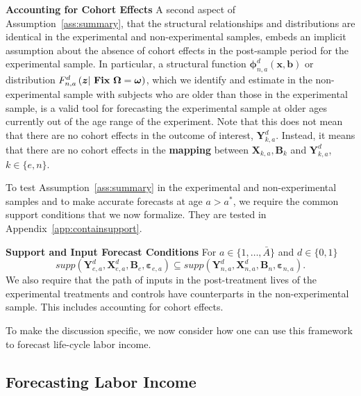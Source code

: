 \begin{remark} \label{remark:cohort} \textbf{Accounting for Cohort Effects}
A second aspect of Assumption~\ref{ass:summary}, that the structural relationships and distributions are identical in the experimental and non-experimental samples, embeds an implicit assumption about the absence of cohort effects in the post-sample period for the experimental sample. In particular, a structural function $\bm{\phi}_{n,a}^d \left( \bm{x}, \bm{b} \right)$ or distribution $F^d_{n,a} \left(\bm{z} | \text{ \text{\textbf{Fix}} } \bm{\Omega} = \bm{\omega}\right)$, which we identify and estimate in the non-experimental sample with subjects who are older than those in the experimental sample, is a valid tool for forecasting the experimental sample at older ages currently out of the age range of the experiment. Note that this does not mean that there are no cohort effects in the outcome of interest, $\bm{Y}^d_{k,a}$. Instead, it means that there are no cohort effects in the \textbf{mapping} between $\bm{X}_{k,a}, \bm{B}_k$ and $\bm{Y}_{k,a}^d$, $k \in \{e,n\}$.
\end{remark}

\doublespacing
To test Assumption~\ref{ass:summary} in the experimental and non-experimental samples and to make accurate forecasts at age $a > a^*$, we require the common support conditions that we now formalize. They are tested in Appendix~\ref{app:containsupport}.

\onehalfspacing
\begin{assumption} \label{ass:contain} \textbf{Support and Input Forecast Conditions}
For $a \in \{ 1, \ldots, \bar{A} \}$ and $d \in \{0,1\}$
\begin{equation}
supp( \bm{Y}_{e,a}^d, \bm{X}^d_{e,a}, \bm{B}_e, \bm{\varepsilon}_{e,a} ) \subseteq supp( \bm{Y}_{n,a}^d, \bm{X}^d_{n,a}, \bm{B}_n, \bm{\varepsilon}_{n,a} ).
\end{equation}
We also require that the path of inputs in the post-treatment lives of the experimental treatments and controls have counterparts in the non-experimental sample. This includes accounting for cohort effects.
\end{assumption}

\doublespacing
To make the discussion specific, we now consider how one can use this framework to forecast life-cycle labor income.

\subsection{Forecasting Labor Income} \label{sec:forecasting}

